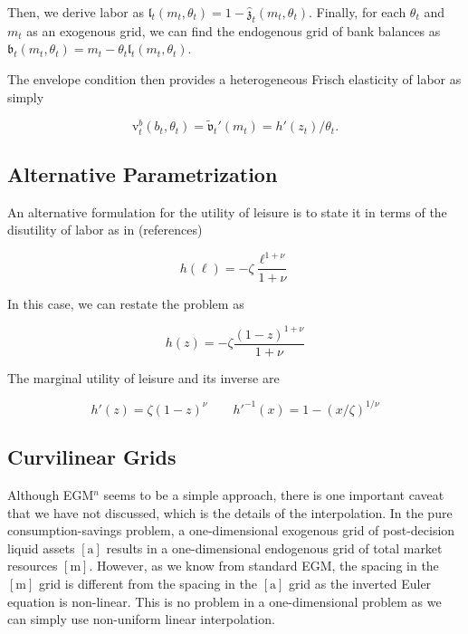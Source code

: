 \documentclass{article}
\newcommand{\tShkEmp}{\theta}
\newcommand{\labShare}{\nu}
\newcommand{\leiShare}{\zeta}
\newcommand{\h}{h}
\newcommand{\bRat}{b}
\newcommand{\leisure}{z}
\newcommand{\vFunc}{\mathrm{v}}
\newcommand{\labor}{\ell}
\newcommand{\mRat}{m}
\newcommand{\vOpt}{\tilde{\mathfrak{v}}}
\newcommand{\xRat}{x}
\newcommand{\aMat}{[\mathrm{a}]}
\newcommand{\mMat}{[\mathrm{m}]}
\newcommand{\zEndFunc}{\mathfrak{z}}
\newcommand{\lEndFunc}{\mathfrak{l}}
\newcommand{\bEndFunc}{\mathfrak{b}}
\begin{document}
Then, we derive labor as $\lEndFunc_{t}(\mRat_{t}, \tShkEmp_{t}) = 1 -
  \hat{\zEndFunc}_{t}(\mRat_{t}, \tShkEmp_{t})$. Finally, for each
$\tShkEmp_{t}$ and
$\mRat_{t}$ as an exogenous grid, we can find the endogenous grid of bank
balances as $\bEndFunc_{t}(\mRat_{t}, \tShkEmp_{t}) = \mRat_{t} -
  \tShkEmp_{t}\lEndFunc_{t}(\mRat_{t}, \tShkEmp_{t})$.

The envelope condition then provides a heterogeneous Frisch elasticity of labor as simply

\begin{equation}
\vFunc_{t}^{b}(\bRat_{t}, \tShkEmp_{t}) = \vOpt_{t}'(\mRat_{t}) =
  \h'(\leisure_{t})/\tShkEmp_{t}.
\end{equation}

\subsection{Alternative Parametrization}\label{Alternative Parametrization}

An alternative formulation for the utility of leisure is to state it in terms
of the disutility of labor as in (references)

\begin{equation}
\h(\labor) = - \leiShare \frac{\labor^{1+\labShare}}{1+\labShare}
\end{equation}

In this case, we can restate the problem as

\begin{equation}
\h(\leisure) = - \leiShare
  \frac{(1-\leisure)^{1+\labShare}}{1+\labShare}
\end{equation}

The marginal utility of leisure and its inverse are

\begin{equation}
\h'(\leisure) = \leiShare(1-\leisure)^{\labShare} \qquad
  \h'^{-1}(\xRat) = 1 - (\xRat/\leiShare)^{1/\labShare}
\end{equation}

\subsection{Curvilinear Grids}\label{Curvilinear Grids}

Although EGM$^n$ seems to be a simple approach, there is one important caveat that we have not discussed, which is the details of the interpolation. In the pure consumption-savings problem, a one-dimensional exogenous grid of post-decision liquid assets $\aMat$ results in a one-dimensional endogenous grid of total market resources $\mMat$. However, as we know from standard EGM, the spacing in the $\mMat$ grid is different from the spacing in the $\aMat$ grid as the inverted Euler equation is non-linear. This is no problem in a one-dimensional problem as we can simply use non-uniform linear interpolation.
\end{document}
